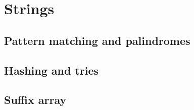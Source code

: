 \chapter{Strings}

\section{Pattern matching and palindromes}

\section{Hashing and tries}

\section{Suffix array}
